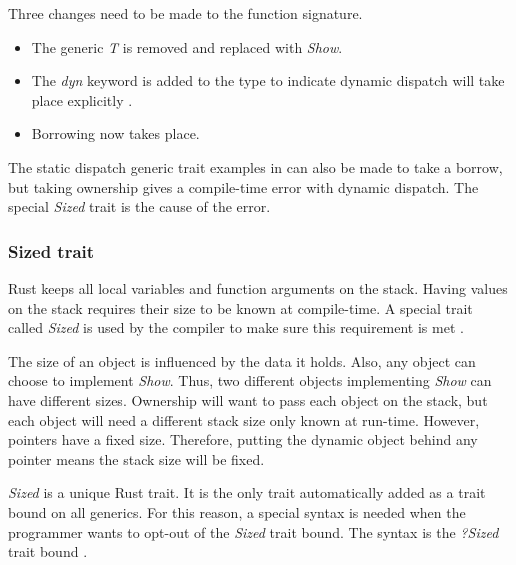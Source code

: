 Three changes need to be made to the function signature.
\begin{itemize}
	\item The generic \textit{T} is removed and replaced with \textit{Show}.
	\item The \textit{dyn} keyword is added to the type to indicate dynamic dispatch will take place explicitly \cite{klabnik_2019_01}.
	\item Borrowing now takes place.
\end{itemize}

The static dispatch generic trait examples in  can also be made to take a borrow, but taking ownership gives a compile-time error with dynamic dispatch.
The special \textit{Sized} trait is the cause of the error.

\subsubsection{Sized trait}
Rust keeps all local variables and function arguments on the stack.
Having values on the stack requires their size to be known at compile-time.
A special trait called \textit{Sized} is used by the compiler to make sure this requirement is met \cite{klabnik_2019_01}.

The size of an object is influenced by the data it holds.
Also, any object can choose to implement \textit{Show}.
Thus, two different objects implementing \textit{Show} can have different sizes.
Ownership will want to pass each object on the stack, but each object will need a different stack size only known at run-time.
However, pointers have a fixed size.
Therefore, putting the dynamic object behind any pointer means the stack size will be fixed.

\begin{notebox}
	\textit{Sized} is a unique Rust trait.
	It is the only trait automatically added as a trait bound on all generics.
	For this reason, a special syntax is needed when the programmer wants to opt-out of the \textit{Sized} trait bound.
	The syntax is the \textit{?Sized} trait bound \cite{klabnik_2019_01}.
\end{notebox}

